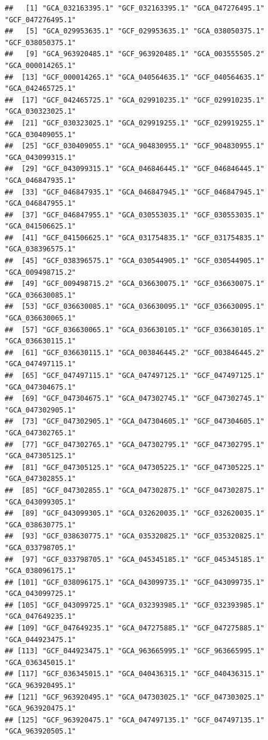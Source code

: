 \documentclass[
]{article}
\begin{document}
\begin{verbatim}
##   [1] "GCA_032163395.1" "GCF_032163395.1" "GCA_047276495.1" "GCF_047276495.1"
##   [5] "GCA_029953635.1" "GCF_029953635.1" "GCA_038050375.1" "GCF_038050375.1"
##   [9] "GCA_963920485.1" "GCF_963920485.1" "GCA_003555505.2" "GCA_000014265.1"
##  [13] "GCF_000014265.1" "GCA_040564635.1" "GCF_040564635.1" "GCA_042465725.1"
##  [17] "GCF_042465725.1" "GCA_029910235.1" "GCF_029910235.1" "GCA_030323025.1"
##  [21] "GCF_030323025.1" "GCA_029919255.1" "GCF_029919255.1" "GCA_030409055.1"
##  [25] "GCF_030409055.1" "GCA_904830955.1" "GCF_904830955.1" "GCA_043099315.1"
##  [29] "GCF_043099315.1" "GCA_046846445.1" "GCF_046846445.1" "GCA_046847935.1"
##  [33] "GCF_046847935.1" "GCA_046847945.1" "GCF_046847945.1" "GCA_046847955.1"
##  [37] "GCF_046847955.1" "GCA_030553035.1" "GCF_030553035.1" "GCA_041506625.1"
##  [41] "GCF_041506625.1" "GCA_031754835.1" "GCF_031754835.1" "GCA_038396575.1"
##  [45] "GCF_038396575.1" "GCA_030544905.1" "GCF_030544905.1" "GCA_009498715.2"
##  [49] "GCF_009498715.2" "GCA_036630075.1" "GCF_036630075.1" "GCA_036630085.1"
##  [53] "GCF_036630085.1" "GCA_036630095.1" "GCF_036630095.1" "GCA_036630065.1"
##  [57] "GCF_036630065.1" "GCA_036630105.1" "GCF_036630105.1" "GCA_036630115.1"
##  [61] "GCF_036630115.1" "GCA_003846445.2" "GCF_003846445.2" "GCA_047497115.1"
##  [65] "GCF_047497115.1" "GCA_047497125.1" "GCF_047497125.1" "GCA_047304675.1"
##  [69] "GCF_047304675.1" "GCA_047302745.1" "GCF_047302745.1" "GCA_047302905.1"
##  [73] "GCF_047302905.1" "GCA_047304605.1" "GCF_047304605.1" "GCA_047302765.1"
##  [77] "GCF_047302765.1" "GCA_047302795.1" "GCF_047302795.1" "GCA_047305125.1"
##  [81] "GCF_047305125.1" "GCA_047305225.1" "GCF_047305225.1" "GCA_047302855.1"
##  [85] "GCF_047302855.1" "GCA_047302875.1" "GCF_047302875.1" "GCA_043099305.1"
##  [89] "GCF_043099305.1" "GCA_032620035.1" "GCF_032620035.1" "GCA_038630775.1"
##  [93] "GCF_038630775.1" "GCA_035320825.1" "GCF_035320825.1" "GCA_033798705.1"
##  [97] "GCF_033798705.1" "GCA_045345185.1" "GCF_045345185.1" "GCA_038096175.1"
## [101] "GCF_038096175.1" "GCA_043099735.1" "GCF_043099735.1" "GCA_043099725.1"
## [105] "GCF_043099725.1" "GCA_032393985.1" "GCF_032393985.1" "GCA_047649235.1"
## [109] "GCF_047649235.1" "GCA_047275885.1" "GCF_047275885.1" "GCA_044923475.1"
## [113] "GCF_044923475.1" "GCA_963665995.1" "GCF_963665995.1" "GCA_036345015.1"
## [117] "GCF_036345015.1" "GCA_040436315.1" "GCF_040436315.1" "GCA_963920495.1"
## [121] "GCF_963920495.1" "GCA_047303025.1" "GCF_047303025.1" "GCA_963920475.1"
## [125] "GCF_963920475.1" "GCA_047497135.1" "GCF_047497135.1" "GCA_963920505.1"

\end{verbatim}
\end{document}
